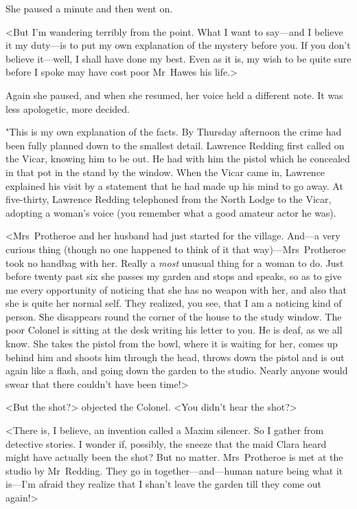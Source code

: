 She paused a minute and then went on.

<But I'm wandering terribly from the point. What I want to say—and I believe it my duty—is to put my own explanation of the mystery before you. If you don't believe it—well, I shall have done my best. Even as it is, my wish to be quite sure before I spoke may have cost poor Mr~Hawes his life.>

Again she paused, and when she resumed, her voice held a different note. It was less apologetic, more decided.

"This is my own explanation of the facts. By Thursday afternoon the crime had been fully planned down to the smallest detail. Lawrence Redding first called on the Vicar, knowing him to be out. He had with him the pistol which he concealed in that pot in the stand by the window. When the Vicar came in, Lawrence explained his visit by a statement that he had made up his mind to go away. At five-thirty, Lawrence Redding telephoned from the North Lodge to the Vicar, adopting a woman's voice (you remember what a good amateur actor he was).

<Mrs~Protheroe and her husband had just started for the village. And—a very curious thing (though no one happened to think of it that way)—Mrs~Protheroe took no handbag with her. Really a \emph{most} unusual thing for a woman to do. Just before twenty past six she passes my garden and stops and speaks, so as to give me every opportunity of noticing that she has no weapon with her, and also that she is quite her normal self. They realized, you see, that I am a noticing kind of person. She disappears round the corner of the house to the study window. The poor Colonel is sitting at the desk writing his letter to you. He is deaf, as we all know. She takes the pistol from the bowl, where it is waiting for her, comes up behind him and shoots him through the head, throws down the pistol and is out again like a flash, and going down the garden to the studio. Nearly anyone would swear that there couldn't have been time!>

<But the shot?> objected the Colonel. <You didn't hear the shot?>

<There is, I believe, an invention called a Maxim silencer. So I gather from detective stories. I wonder if, possibly, the sneeze that the maid Clara heard might have actually been the shot? But no matter. Mrs~Protheroe is met at the studio by Mr~Redding. They go in together—and—human nature being what it is—I'm afraid they realize that I shan't leave the garden till they come out again!>

